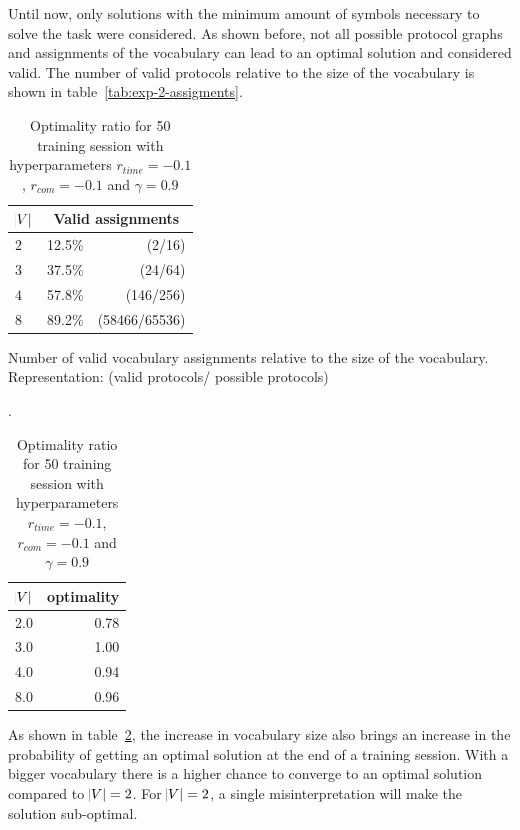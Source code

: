 Until now, only solutions with the minimum amount of symbols necessary to solve the task were considered. As shown before, not all possible protocol graphs and assignments of the vocabulary can lead to an optimal solution and considered valid. The number of valid protocols relative to the size of the vocabulary is shown in table~\ref{tab:exp-2-assigments}. 

\begin{table}[H]
\centering
\begin{minipage}[t]{.5\textwidth}
    \centering
    \begin{tabular}{lrr}
    \toprule
    $\abs{V} $ & \multicolumn{2}{c}{Valid assignments} \\
    \midrule
    $2$ & 12.5\% & (2/16)\\
    $3$ & 37.5\% & (24/64)\\
    $4$ & 57.8\% & (146/256)\\
    $8$ & 89.2\% & (58466/65536)\\
    \bottomrule
    \end{tabular}
    \caption[Number of valid vocabulary assignments]{Number of valid vocabulary assignments relative to the size of the vocabulary. Representation: (valid protocols/ possible protocols)}.
    \label{tab:exp-2-assigments}
\end{minipage}%
\begin{minipage}[t]{.50\textwidth}
    \centering
    \begin{tabular}{lr}
    \toprule
    $\abs{V} $ &  optimality \\
    \midrule
    2.0 &   0.78 \\
    3.0 &   1.00 \\
    4.0 &   0.94 \\
    8.0 &   0.96 \\
    \bottomrule
    \end{tabular}
    \caption[Optimality ratios with default hyperparameters relative to vocabulary size]{Optimality ratio for 50 training session with hyperparameters $r_{time}=-0.1$, $r_{com}=-0.1$ and $\gamma=0.9$}
    \label{tab:exp-2-vocabulary-optimal}
\end{minipage}
\end{table}

As shown in table~\ref{tab:exp-2-vocabulary-optimal}, the increase in vocabulary size also brings an increase in the probability of getting an optimal solution at the end of a training session. With a bigger vocabulary there is a higher chance to converge to an optimal solution compared to $\abs{V}=2$. For $\abs{V}=2$, a single misinterpretation will make the solution sub-optimal. 

